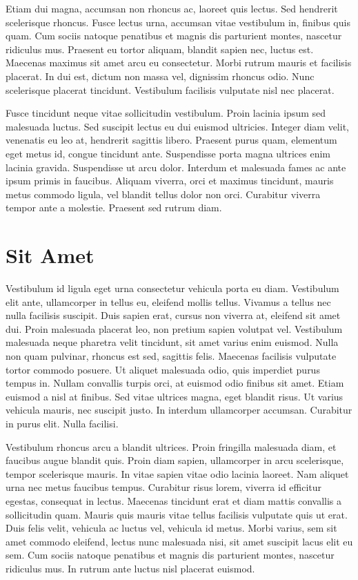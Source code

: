 \documentclass{myCompactDoc}
\begin{document}
Etiam dui magna, accumsan non rhoncus ac, laoreet quis lectus. Sed hendrerit scelerisque rhoncus. Fusce lectus urna, accumsan vitae vestibulum in, finibus quis quam. Cum sociis natoque penatibus et magnis dis parturient montes, nascetur ridiculus mus. Praesent eu tortor aliquam, blandit sapien nec, luctus est. Maecenas maximus sit amet arcu eu consectetur. Morbi rutrum mauris et facilisis placerat. In dui est, dictum non massa vel, dignissim rhoncus odio. Nunc scelerisque placerat tincidunt. Vestibulum facilisis vulputate nisl nec placerat.

Fusce tincidunt neque vitae sollicitudin vestibulum. Proin lacinia ipsum sed malesuada luctus. Sed suscipit lectus eu dui euismod ultricies. Integer diam velit, venenatis eu leo at, hendrerit sagittis libero. Praesent purus quam, elementum eget metus id, congue tincidunt ante. Suspendisse porta magna ultrices enim lacinia gravida. Suspendisse ut arcu dolor. Interdum et malesuada fames ac ante ipsum primis in faucibus. Aliquam viverra, orci et maximus tincidunt, mauris metus commodo ligula, vel blandit tellus dolor non orci. Curabitur viverra tempor ante a molestie. Praesent sed rutrum diam.

\section{Sit Amet}
Vestibulum id ligula eget urna consectetur vehicula porta eu diam. Vestibulum elit ante, ullamcorper in tellus eu, eleifend mollis tellus. Vivamus a tellus nec nulla facilisis suscipit. Duis sapien erat, cursus non viverra at, eleifend sit amet dui. Proin malesuada placerat leo, non pretium sapien volutpat vel. Vestibulum malesuada neque pharetra velit tincidunt, sit amet varius enim euismod. Nulla non quam pulvinar, rhoncus est sed, sagittis felis. Maecenas facilisis vulputate tortor commodo posuere. Ut aliquet malesuada odio, quis imperdiet purus tempus in. Nullam convallis turpis orci, at euismod odio finibus sit amet. Etiam euismod a nisl at finibus. Sed vitae ultrices magna, eget blandit risus. Ut varius vehicula mauris, nec suscipit justo. In interdum ullamcorper accumsan. Curabitur in purus elit. Nulla facilisi.

Vestibulum rhoncus arcu a blandit ultrices. Proin fringilla malesuada diam, et faucibus augue blandit quis. Proin diam sapien, ullamcorper in arcu scelerisque, tempor scelerisque mauris. In vitae sapien vitae odio lacinia laoreet. Nam aliquet urna nec metus faucibus tempus. Curabitur risus lorem, viverra id efficitur egestas, consequat in lectus. Maecenas tincidunt erat et diam mattis convallis a sollicitudin quam. Mauris quis mauris vitae tellus facilisis vulputate quis ut erat. Duis felis velit, vehicula ac luctus vel, vehicula id metus. Morbi varius, sem sit amet commodo eleifend, lectus nunc malesuada nisi, sit amet suscipit lacus elit eu sem. Cum sociis natoque penatibus et magnis dis parturient montes, nascetur ridiculus mus. In rutrum ante luctus nisl placerat euismod.
\end{document}
